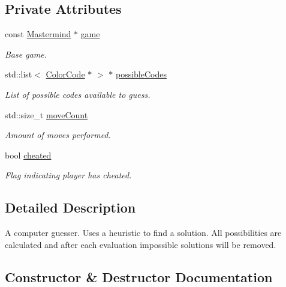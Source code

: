 \subsection*{Private Attributes}
\begin{DoxyCompactItemize}
\item 
const \hyperlink{classmastermind_1_1logic_1_1_mastermind}{Mastermind} $\ast$ \hyperlink{classmastermind_1_1logic_1_1_computer_guesser_a2f061369ee7e4e0319093a182fc41065}{game}
\begin{DoxyCompactList}\small\item\em Base game. \end{DoxyCompactList}\item 
std\+::list$<$ \hyperlink{classmastermind_1_1logic_1_1_color_code}{Color\+Code} $\ast$ $>$ $\ast$ \hyperlink{classmastermind_1_1logic_1_1_computer_guesser_af2500a37b694f1b2cb8f3242c618def4}{possible\+Codes}
\begin{DoxyCompactList}\small\item\em List of possible codes available to guess. \end{DoxyCompactList}\item 
std\+::size\+\_\+t \hyperlink{classmastermind_1_1logic_1_1_computer_guesser_a76f33b29e742132ea800947b2ec0347a}{move\+Count}
\begin{DoxyCompactList}\small\item\em Amount of moves performed. \end{DoxyCompactList}\item 
bool \hyperlink{classmastermind_1_1logic_1_1_computer_guesser_a2a2d1f455eb90493517bf8d1067adb31}{cheated}
\begin{DoxyCompactList}\small\item\em Flag indicating player has cheated. \end{DoxyCompactList}\end{DoxyCompactItemize}


\subsection{Detailed Description}
A computer guesser. Uses a heuristic to find a solution. All possibilities are calculated and after each evaluation impossible solutions will be removed. 

\subsection{Constructor \& Destructor Documentation}
\hypertarget{classmastermind_1_1logic_1_1_computer_guesser_a685a4f74519d1dbfb3e6e429bb6d6a60}{}\label{classmastermind_1_1logic_1_1_computer_guesser_a685a4f74519d1dbfb3e6e429bb6d6a60} 

